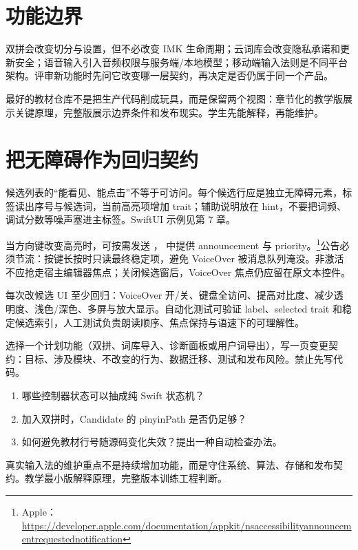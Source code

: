 \section{功能边界}

双拼会改变切分与设置，但不必改变 IMK 生命周期；云词库会改变隐私承诺和更新安全；语音输入引入音频权限与服务端/本地模型；移动端输入法则是不同平台架构。评审新功能时先问它改变哪一层契约，再决定是否仍属于同一个产品。

\begin{concept}[教学版与完整版共存]
最好的教材仓库不是把生产代码削成玩具，而是保留两个视图：章节化的教学版展示关键原理，完整版展示边界条件和发布现实。学生先能解释，再能维护。
\end{concept}

\section{把无障碍作为回归契约}

候选列表的“能看见、能点击”不等于可访问。每个候选行应是独立无障碍元素，标签读出序号与候选词，当前高亮项增加  trait；辅助说明放在 hint，不要把词频、调试分数等噪声塞进主标签。SwiftUI 示例见第 7 章。

当方向键改变高亮时，可按需发送 ， 中提供 announcement 与 priority。\footnote{Apple：\url{https://developer.apple.com/documentation/appkit/nsaccessibilityannouncementrequestednotification}}公告必须节流：按键长按时只读最终稳定项，避免 VoiceOver 被消息队列淹没。非激活  不应抢走宿主编辑器焦点；关闭候选窗后，VoiceOver 焦点仍应留在原文本控件。

每次改候选 UI 至少回归：VoiceOver 开/关、键盘全访问、提高对比度、减少透明度、浅色/深色、多屏与放大显示。自动化测试可验证 label、selected trait 和稳定候选索引，人工测试负责朗读顺序、焦点保持与语速下的可理解性。

\begin{lab}[架构评审]
选择一个计划功能（双拼、词库导入、诊断面板或用户词导出），写一页变更契约：目标、涉及模块、不改变的行为、数据迁移、测试和发布风险。禁止先写代码。
\end{lab}

\exercises
\begin{enumerate}
  \item 哪些控制器状态可以抽成纯 Swift 状态机？
  \item 加入双拼时，Candidate 的 pinyinPath 是否仍足够？
  \item 如何避免教材行号随源码变化失效？提出一种自动检查办法。
\end{enumerate}

\begin{summarybox}
真实输入法的维护重点不是持续增加功能，而是守住系统、算法、存储和发布契约。教学最小版解释原理，完整版本训练工程判断。
\end{summarybox}

